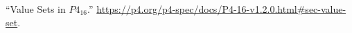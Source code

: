 \documentclass[11pt]{article}
\begin{document}
{{\begin{thebibliography}{39}
\mdbibitemlabel{{}[39]}\textquotedblleft{}Value Sets in $P4_{16}$.\textquotedblright{} \href{https://p4.org/p4-spec/docs/P4-16-v1.2.0.html\%23sec-value-set}{{\ttfamily https://\hspace{0pt}p4.\hspace{0pt}org/\hspace{0pt}p4-\hspace{0pt}spec/\hspace{0pt}docs/\hspace{0pt}P4-\hspace{0pt}16-\hspace{0pt}v1.\hspace{0pt}2.\hspace{0pt}0.\hspace{0pt}html\#\hspace{0pt}sec-\hspace{0pt}value-\hspace{0pt}set}}.\label{p4valuesets}%
\par%
\end{thebibliography}}%
}%
\end{document}
